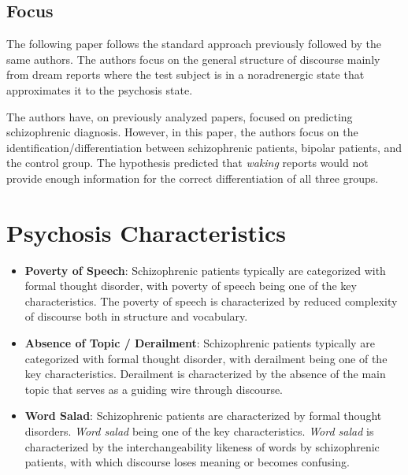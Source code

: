 \documentclass{Paper_Summary}
\begin{document}
\makepapertitle

\breakline

\begin{center}
    \section*{Focus}
\end{center}

    The following paper follows the standard approach previously followed by the same authors. The authors focus on the general structure of discourse mainly from dream reports where the test subject is in a noradrenergic state that approximates it to the psychosis state.

    The authors have, on previously analyzed papers, focused on predicting schizophrenic diagnosis. However, in this paper, the authors focus on the identification/differentiation between schizophrenic patients, bipolar patients, and the control group. The hypothesis predicted that \emph{waking} reports would not provide enough information for the correct differentiation of all three groups.

\breakline

\newpage

\section{Psychosis Characteristics}
    \begin{itemize}
        \item \textbf{Poverty of Speech}: Schizophrenic patients typically are categorized with formal thought disorder, with poverty of speech being one of the key characteristics. The poverty of speech is characterized by reduced complexity of discourse both in structure and vocabulary.
        \item \textbf{Absence of Topic / Derailment}: Schizophrenic patients typically are categorized with formal thought disorder, with derailment being one of the key characteristics. Derailment is characterized by the absence of the main topic that serves as a guiding wire through discourse.
        \item \textbf{Word Salad}: Schizophrenic patients are characterized by formal thought disorders. \emph{Word salad} being one of the key characteristics. \emph{Word salad} is characterized by the interchangeability likeness of words by schizophrenic patients, with which discourse loses meaning or becomes confusing. 
    
    \end{itemize}
\end{document}
